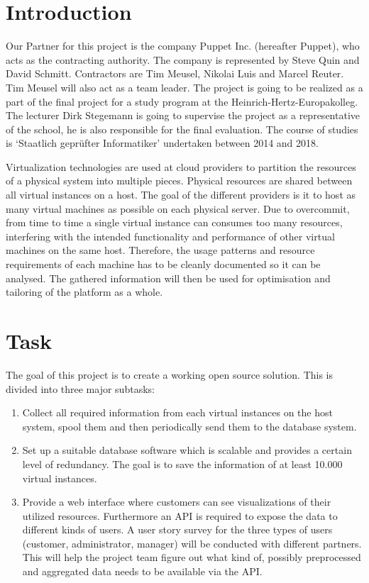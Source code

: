 \section{Introduction}

Our Partner for this project is the company Puppet Inc. (hereafter Puppet), who
acts as the contracting authority. The company is represented by Steve Quin and
David Schmitt. Contractors are Tim Meusel, Nikolai Luis and Marcel Reuter. Tim
Meusel will also act as a team leader. The project is going to be realized as a
part of the final project for a study program at the
Heinrich-Hertz-Europakolleg. The lecturer Dirk Stegemann is going to supervise
the project as a representative of the school, he is also responsible for the
final evaluation. The course of studies is `Staatlich geprüfter Informatiker'
undertaken between 2014 and 2018.

Virtualization technologies are used at cloud providers to partition the
resources of a physical system into multiple pieces. Physical resources are
shared between all virtual instances on a host. The goal of the different
providers is it to host as many virtual machines as possible on each physical
server. Due to overcommit, from time to time a single virtual instance can
consumes too many resources, interfering with the intended functionality and
performance of other virtual machines on the same host. Therefore, the usage
patterns and resource requirements of each machine has to be cleanly documented
so it can be analysed. The gathered information will then be used for
optimisation and tailoring of the platform as a whole.

\section{Task}

The goal of this project is to create a working open source solution. This is
divided into three major subtasks:
\begin{enumerate}
    \item Collect all required information from each virtual instances on the
          host system, spool them and then periodically send them to the database system.
    \item Set up a suitable database software which is scalable and provides a
          certain level of redundancy. The goal is to save the information of at least
          10.000 virtual instances.
    \item Provide a web interface where customers can see visualizations of
          their utilized resources. Furthermore an API is required to expose the data to
          different kinds of users. A user story survey for the three types of users
          (customer, administrator, manager) will be conducted with different partners.
          This will help the project team figure out what kind of, possibly preprocessed
          and aggregated data needs to be available via the API.
\end{enumerate}

